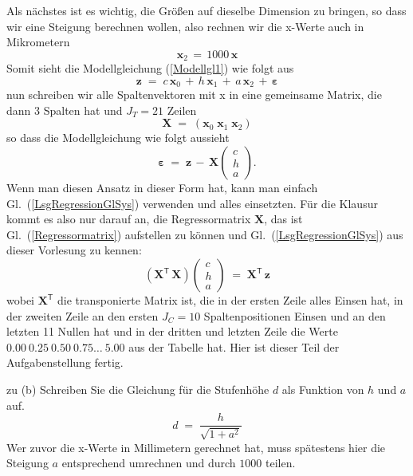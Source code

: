 Als nächstes ist es wichtig, die Größen auf dieselbe Dimension zu bringen,
so dass wir eine Steigung berechnen wollen, also rechnen wir die x-Werte auch in Mikrometern
$$
\boldsymbol x_2 \, = \, 1000 \, \boldsymbol x
$$
Somit sieht die Modellgleichung (\ref{Modellgl1}) wie folgt aus
$$
\boldsymbol z \; = \;  c \,  \boldsymbol x_0 \,  + \, h \, \boldsymbol x_1 \, + \, a \, \boldsymbol x_2 \, + \, \boldsymbol \varepsilon
$$
nun schreiben wir alle Spaltenvektoren mit x in eine gemeinsame Matrix, die dann 3 Spalten hat und $J_T = 21$ Zeilen
\begin{equation}
\boldsymbol X \; = \; \left(\boldsymbol x_0 \; \boldsymbol x_1 \; \boldsymbol x_2 \right)
\label{Regressormatrix}
\end{equation}
so dass die Modellgleichung wie folgt aussieht
$$
\boldsymbol \varepsilon  \; = \;  \boldsymbol z \, - \, \boldsymbol X
\left(\begin{array}{c}
c\\
h\\
a
\end{array}\right) .
$$
Wenn man diesen Ansatz in dieser Form hat, kann man einfach Gl.~(\ref{LsgRegressionGlSys}) 
verwenden und alles einsetzten.
Für die Klausur kommt es also nur darauf an, die Regressormatrix $\boldsymbol X$, das ist Gl.~(\ref{Regressormatrix})
aufstellen zu können und Gl.~(\ref{LsgRegressionGlSys}) aus dieser Vorlesung zu kennen:
\begin{equation}
\left( \mathbf{X}^\mathsf{T}  \, \mathbf{X} \right) \left(\begin{array}{c}
c\\
h\\
a
\end{array}\right) \; = \;
 \mathbf{X}^\mathsf{T} \, \mathbf{z} 
\end{equation}
wobei $\boldsymbol X^\mathsf{T}$ die transponierte Matrix ist, die in der ersten Zeile alles Einsen hat, in der
zweiten Zeile an den ersten $J_C = 10$ Spaltenpositionen Einsen und an den letzten 11 Nullen hat und in der dritten
und letzten Zeile die Werte $0.00 ~ 0.25 ~ 0.50 ~ 0.75 \dots ~5.00$ aus der Tabelle hat.
Hier ist dieser Teil der Aufgabenstellung fertig.


zu (b) Schreiben Sie die Gleichung für die Stufenhöhe $d$ als Funktion von $h$ und $a$ auf.
\begin{equation}
d \; = \; \frac{h}{\sqrt{1 + a^2}}
\end{equation}
Wer zuvor die x-Werte in Millimetern gerechnet hat, muss spätestens hier die Steigung
$a$ entsprechend umrechnen und durch $1000$ teilen.

